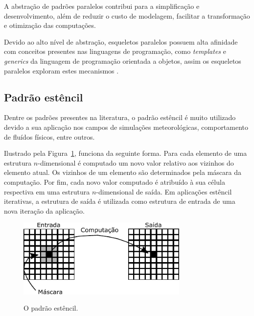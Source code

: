 A abstração de padrões paralelos contribui para a simplificação e desenvolvimento, além de reduzir o custo de modelagem, facilitar a transformação e otimização das computações.

Devido ao alto nível de abstração, esqueletos paralelos possuem alta afinidade com conceitos presentes nas linguagens de programação, como \textit{templates} e \textit{generics} da linguagem de programação orientada a objetos, assim os esqueletos paralelos exploram estes mecanismos \cite{Gorlatch2011}.

\subsection{Padrão estêncil}
\label{subsec:stencil}

Dentre os padrões presentes na literatura, o padrão estêncil é muito utilizado devido a sua aplicação nos campos de simulações meteorológicas, comportamento de fluídos físicos, entre outros.

Ilustrado pela Figura~\ref{fig:stencil}, funciona da seguinte forma. Para cada elemento de uma estrutura $n$-dimensional é computado um novo valor relativo aos vizinhos do elemento atual. Os vizinhos de um elemento são determinados pela máscara da computação. Por fim, cada novo valor computado é atribuído à sua célula respectiva em uma estrutura $n$-dimensional de saída. Em aplicações estêncil iterativas, a estrutura de saída é utilizada como estrutura de entrada de uma nova iteração da aplicação.

\begin{figure}
    \centering
    \caption{O padrão estêncil.}
    \includegraphics[width=0.75\textwidth]{figs/stencilComputation.pdf} \\
    \label{fig:stencil}
\end{figure}

\section{\pskel}

